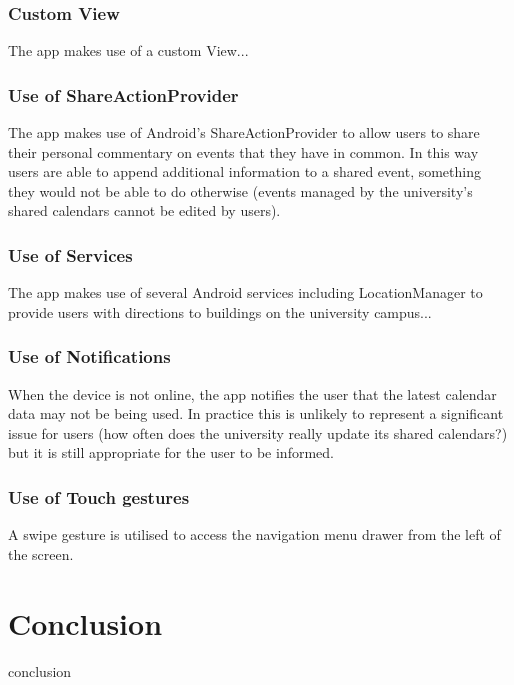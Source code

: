\documentclass{article}
\begin{document}
\subsubsection{Custom View}
The app makes use of a custom View...
\subsubsection{Use of ShareActionProvider}
The app makes use of Android's ShareActionProvider to allow users to share their personal commentary on events that they have in common. In this way users are able to append additional information to a shared event, something they would not be able to do otherwise (events managed by the university's shared calendars cannot be edited by users).
\subsubsection{Use of Services}
The app makes use of several Android services including LocationManager to provide users with directions to buildings on the university campus... 
\subsubsection{Use of Notifications}
When the device is not online, the app notifies the user that the latest calendar data may not be being used. In practice this is unlikely to represent a significant issue for users (how often does the university really update its shared calendars?) but it is still appropriate for the user to be informed.
\subsubsection{Use of Touch gestures}
A swipe gesture is utilised to access the navigation menu drawer from the left of the screen.

\section{Conclusion}
conclusion
\end{document}

